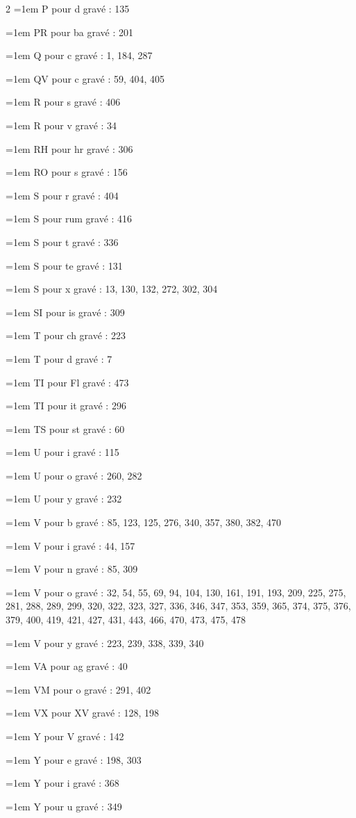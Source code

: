 \begin{multicols}{2}
\hangindent=1em P pour d gravé : 135\par
\hangindent=1em PR pour ba gravé : 201\par
\hangindent=1em Q pour c gravé : 1, 184, 287\par
\hangindent=1em QV pour c gravé : 59, 404, 405\par
\hangindent=1em R pour s gravé : 406\par
\hangindent=1em R pour v gravé : 34\par
\hangindent=1em RH pour hr gravé : 306\par
\hangindent=1em RO pour s gravé : 156\par
\hangindent=1em S pour r gravé : 404\par
\hangindent=1em S pour rum gravé : 416\par
\hangindent=1em S pour t gravé : 336\par
\hangindent=1em S pour te gravé : 131\par
\hangindent=1em S pour x gravé : 13, 130, 132, 272, 302, 304\par
\hangindent=1em SI pour is gravé : 309\par
\hangindent=1em T pour ch gravé : 223\par
\hangindent=1em T pour d gravé : 7\par
\hangindent=1em TI pour Fl gravé : 473\par
\hangindent=1em TI pour it gravé : 296\par
\hangindent=1em TS pour st gravé : 60\par
\hangindent=1em U pour i gravé : 115\par
\hangindent=1em U pour o gravé : 260, 282\par
\hangindent=1em U pour y gravé : 232\par
\hangindent=1em V pour b gravé : 85, 123, 125, 276, 340, 357, 380, 382, 470\par
\hangindent=1em V pour i gravé : 44, 157\par
\hangindent=1em V pour n gravé : 85, 309\par
\hangindent=1em V pour o gravé : 32, 54, 55, 69, 94, 104, 130, 161, 191, 193, 209, 225, 275, 281, 288, 289, 299, 320, 322, 323, 327, 336, 346, 347, 353, 359, 365, 374, 375, 376, 379, 400, 419, 421, 427, 431, 443, 466, 470, 473, 475, 478\par
\hangindent=1em V pour y gravé : 223, 239, 338, 339, 340\par
\hangindent=1em VA pour ag gravé : 40\par
\hangindent=1em VM pour o gravé : 291, 402\par
\hangindent=1em VX pour XV gravé : 128, 198\par
\hangindent=1em Y pour V gravé : 142\par
\hangindent=1em Y pour e gravé : 198, 303\par
\hangindent=1em Y pour i gravé : 368\par
\hangindent=1em Y pour u gravé : 349\par\end{multicols}
